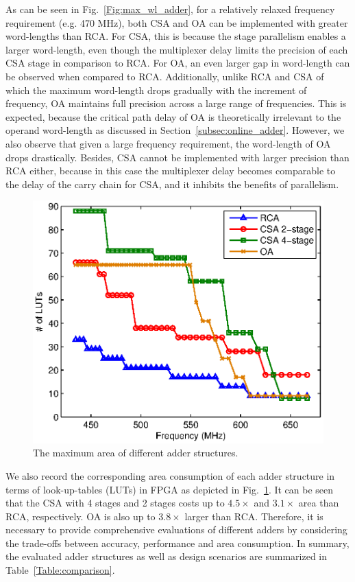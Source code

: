 \documentclass[10pt, conference, compsocconf]{IEEEtran}
\begin{document}
As can be seen in Fig.~\ref{Fig:max_wl_adder}, for a relatively relaxed frequency requirement (e.g. 470 MHz), both CSA and OA can be implemented with greater word-lengths than RCA. For CSA, this is because the stage parallelism enables a larger word-length, even though the multiplexer delay limits the precision of each CSA stage in comparison to RCA. For OA, an even larger gap in word-length can be observed when compared to RCA. Additionally, unlike RCA and CSA of which the maximum word-length drops gradually with the increment of frequency, OA maintains full precision across a large range of frequencies. This is expected, because the critical path delay of OA is theoretically irrelevant to the operand word-length as discussed in Section~\ref{subsec:online_adder}. However, we also observe that given a large frequency requirement, the word-length of OA drops drastically. Besides, CSA cannot be implemented with larger precision than RCA either, because in this case the multiplexer delay becomes comparable to the delay of the carry chain for CSA, and it inhibits the benefits of parallelism.
%
\begin{figure}[tbp]
  \centering
  \includegraphics[width=.5\textwidth]{./figures/exp/area_adders.eps}
  \vspace{-4ex}
  \caption{The maximum area of different adder structures.}
  \label{Fig:area_adder}
\end{figure}

We also record the corresponding area consumption of each adder structure in terms of look-up-tables (LUTs) in FPGA as depicted in Fig.~\ref{Fig:area_adder}. It can be seen that the CSA with 4 stages and 2 stages costs up to $4.5\times$ and $3.1\times$ area than RCA, respectively. OA is also up to $3.8\times$ larger than RCA. Therefore, it is necessary to provide comprehensive evaluations of different adders by considering the trade-offs between accuracy, performance and area consumption. In summary, the evaluated adder structures as well as design scenarios are summarized in Table~\ref{Table:comparison}.
\end{document}
